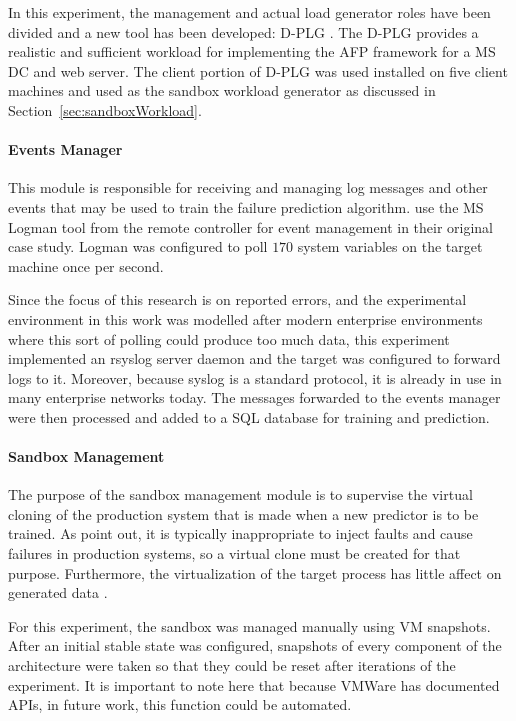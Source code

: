 In this experiment, the management and actual load generator roles have been
divided and a new tool has been developed: \ac{D-PLG} \citep{jordan2016}.  The
\ac{D-PLG} provides a realistic and sufficient workload for implementing the
\ac{AFP} framework for a \ac{MS} \ac{DC} and web server.  The client portion of
\ac{D-PLG} was used installed on five client machines and used as the sandbox
workload generator as discussed in Section~\ref{sec:sandboxWorkload}.

\paragraph{Events Manager} \label{sec:eventsManagerMgr}
This module is responsible for receiving and managing log messages and other
events that may be used to train the failure prediction algorithm.
\citet{irrera2015} use the \ac{MS} Logman tool from the remote controller for
event management in their original case study.  Logman was configured to poll
$170$ system variables on the target machine once per second.  

Since the focus of this research is on reported errors, and the experimental
environment in this work was modelled after modern enterprise environments
where this sort of polling could produce too much data, this experiment
implemented an rsyslog server daemon and the target was configured to forward
logs to it.  Moreover, because syslog is a standard protocol, it is already in
use in many enterprise networks today.  The messages forwarded to the events
manager were then processed and added to a \ac{SQL} database for training and
prediction.  

\paragraph{Sandbox Management} \label{sec:sandboxMgr} 
The purpose of the sandbox management module is to supervise the virtual
cloning of the production system that is made when a new predictor is to be
trained.  As \citet{irrera2013,irrera2015} point out, it is typically
inappropriate to inject faults and cause failures in production systems, so a
virtual clone must be created for that purpose.  Furthermore, the
virtualization of the target process has little affect on generated data
\citep{irrera2013}.

For this experiment, the sandbox was managed manually using \ac{VM} snapshots.
After an initial stable state was configured, snapshots of every component of
the architecture were taken so that they could be reset after iterations of the
experiment.  It is important to note here that because VMWare has documented
\ac{API}s, in future work, this function could be automated.

